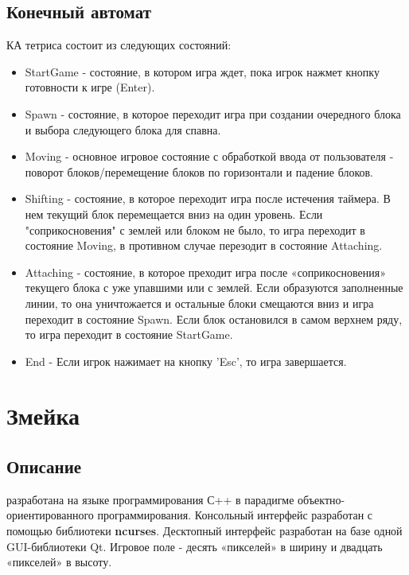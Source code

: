 \documentclass{article}
\begin{document}
\subsection{Конечный автомат}
КА тетриса состоит из следующих состояний:
\begin{itemize}
    \item StartGame - состояние, в котором игра ждет, пока игрок нажмет кнопку готовности к игре (Enter).
    \item Spawn - состояние, в которое переходит игра при создании очередного блока и выбора следующего блока для спавна.
    \item Moving - основное игровое состояние с обработкой ввода от пользователя - поворот блоков/перемещение блоков по горизонтали и падение блоков.
    \item Shifting - состояние, в которое переходит игра после истечения таймера. В нем текущий блок перемещается вниз на один уровень. Если "соприкосновения" с землей или блоком не было, то игра переходит в состояние Moving, в противном случае перезодит в состояние Attaching.
    \item Attaching - состояние, в которое преходит игра после «соприкосновения» текущего блока с уже упавшими или с землей. Если образуются заполненные линии, то она уничтожается и остальные блоки смещаются вниз и игра переходит в состояние Spawn. Если блок остановился в самом верхнем ряду, то игра переходит в состояние StartGame.
    \item End - Если игрок нажимает на кнопку 'Esc', то игра завершается.
\end{itemize}


\section{Змейка}
\subsection{Описание}
 разработана на языке программирования С++ в парадигме объектно-ориентированного программирования. Консольный интерфейс разработан с помощью библиотеки \textbf{ncurses}. 
Десктопный интерфейс разработан на базе одной GUI-библиотеки Qt.
Игровое поле - десять «пикселей» в ширину и двадцать «пикселей» в высоту.
\end{document}
